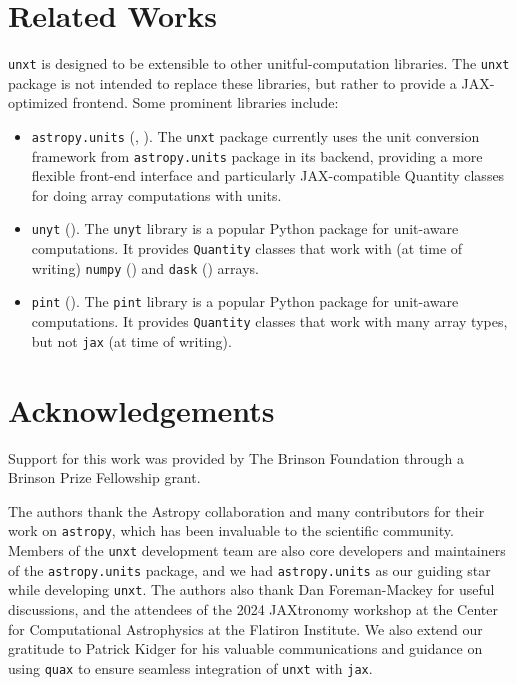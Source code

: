 \documentclass[
]{article}
\providecommand{\tightlist}{%
  \setlength{\itemsep}{0pt}\setlength{\parskip}{0pt}}
\begin{document}
\section{Related Works}\label{related-works}

\texttt{unxt} is designed to be extensible to other unitful-computation
libraries. The \texttt{unxt} package is not intended to replace these
libraries, but rather to provide a JAX-optimized frontend. Some
prominent libraries include:

\begin{itemize}
\tightlist
\item
  \texttt{astropy.units} (, ). The
  \texttt{unxt} package currently uses the unit conversion framework
  from \texttt{astropy.units} package in its backend, providing a more
  flexible front-end interface and particularly JAX-compatible Quantity
  classes for doing array computations with units.
\item
  \texttt{unyt} (). The
  \texttt{unyt} library is a popular Python package for unit-aware
  computations. It provides \texttt{Quantity} classes that work with (at
  time of writing) \texttt{numpy} () and \texttt{dask} () arrays.
\item
  \texttt{pint} (). The \texttt{pint}
  library is a popular Python package for unit-aware computations. It
  provides \texttt{Quantity} classes that work with many array types,
  but not \texttt{jax} (at time of writing).
\end{itemize}

\section{Acknowledgements}\label{acknowledgements}

Support for this work was provided by The Brinson Foundation through a
Brinson Prize Fellowship grant.

The authors thank the Astropy collaboration and many contributors for
their work on \texttt{astropy}, which has been invaluable to the
scientific community. Members of the \texttt{unxt} development team are
also core developers and maintainers of the \texttt{astropy.units}
package, and we had \texttt{astropy.units} as our guiding star while
developing \texttt{unxt}. The authors also thank Dan Foreman-Mackey for
useful discussions, and the attendees of the 2024 JAXtronomy workshop at
the Center for Computational Astrophysics at the Flatiron Institute. We
also extend our gratitude to Patrick Kidger for his valuable
communications and guidance on using \texttt{quax} to ensure seamless
integration of \texttt{unxt} with \texttt{jax}.
\end{document}
